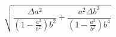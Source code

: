 
\pagestyle{empty} 
\fancyhead{} 
\fancyhead[R]{} 
\fancyhead[L]{} 

\fancyfoot{} 
\fancyfoot[C]{\thepage} 
\usepackage{colortbl}
\usepackage{lscape}
\usepackage{booktabs,array}
 
\begin{equation}
	\sqrt{\frac{\Delta a^2}{\left(1-\frac{a^2}{b^2}\right)b^2}+\frac{a^2
	\Delta b^2}{\left(1-\frac{a^2}{b^2}\right)b^4}}
\end{equation}
% 
% 

% 


